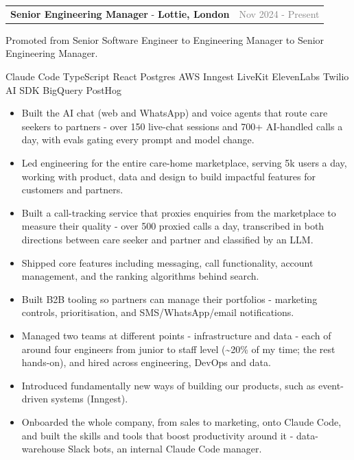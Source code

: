 \documentclass[10pt,a4paper]{extarticle}
\makeatletter
\newcommand{\role}[3]{%
  \vspace{3pt}\noindent\begin{tabularx}{\textwidth}{@{}Xr@{}}
  \textbf{#1} - \textbf{#2} & \textcolor{grey}{\small #3}
  \end{tabularx}\par}
\newcommand{\stack}[1]{{\footnotesize\color{accent}#1}\par\vspace{1pt}}
\newcommand{\progression}[1]{{\footnotesize\color{grey}#1}\par\vspace{1pt}}
\makeatother
\begin{document}
\role{Senior Engineering Manager}{Lottie, London}{Nov 2024 - Present}
\progression{Promoted from Senior Software Engineer to Engineering Manager to Senior Engineering Manager.}
\stack{Claude Code \textcolor{black}{\textbar{}} TypeScript \textcolor{black}{\textbar{}} React \textcolor{black}{\textbar{}} Postgres \textcolor{black}{\textbar{}} AWS \textcolor{black}{\textbar{}} Inngest \textcolor{black}{\textbar{}} LiveKit \textcolor{black}{\textbar{}} ElevenLabs \textcolor{black}{\textbar{}} Twilio \textcolor{black}{\textbar{}} AI SDK \textcolor{black}{\textbar{}} BigQuery \textcolor{black}{\textbar{}} PostHog}
\begin{itemize}
\item Built the AI chat (web and WhatsApp) and voice agents that route care seekers to partners - over 150 live-chat sessions and 700+ AI-handled calls a day, with evals gating every prompt and model change.
\item Led engineering for the entire care-home marketplace, serving 5k users a day, working with product, data and design to build impactful features for customers and partners.
\item Built a call-tracking service that proxies enquiries from the marketplace to measure their quality - over 500 proxied calls a day, transcribed in both directions between care seeker and partner and classified by an LLM.
\item Shipped core features including messaging, call functionality, account management, and the ranking algorithms behind search.
\item Built B2B tooling so partners can manage their portfolios - marketing controls, prioritisation, and SMS/WhatsApp/email notifications.
\item Managed two teams at different points - infrastructure and data - each of around four engineers from junior to staff level (\textasciitilde20\% of my time; the rest hands-on), and hired across engineering, DevOps and data.
\item Introduced fundamentally new ways of building our products, such as event-driven systems (Inngest).
\item Onboarded the whole company, from sales to marketing, onto Claude Code, and built the skills and tools that boost productivity around it - data-warehouse Slack bots, an internal Claude Code manager.
\end{itemize}
\end{document}
